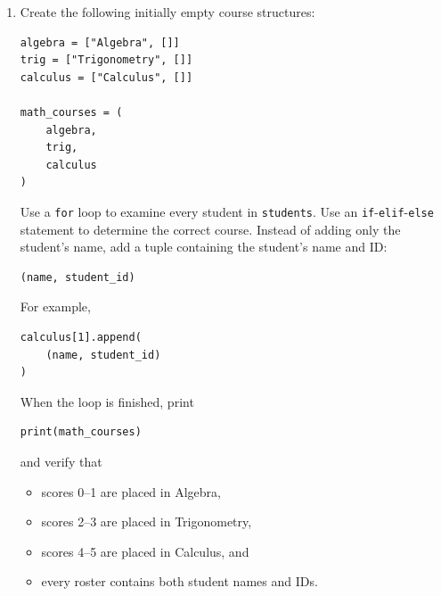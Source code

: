 \documentclass{article}
\begin{document}
\begin{enumerate}

\item Create the following initially empty course structures:

\begin{verbatim}
algebra = ["Algebra", []]
trig = ["Trigonometry", []]
calculus = ["Calculus", []]

math_courses = (
    algebra,
    trig,
    calculus
)
\end{verbatim}

Use a \texttt{for} loop to examine every student in
\texttt{students}.  Use an \texttt{if}-\texttt{elif}-\texttt{else} statement to determine the correct course. Instead of adding only the student's name, add a tuple containing the student's name and ID:

\begin{verbatim}
(name, student_id)
\end{verbatim}

For example,

\begin{verbatim}
calculus[1].append(
    (name, student_id)
)
\end{verbatim}

When the loop is finished, print

\begin{verbatim}
print(math_courses)
\end{verbatim}

and verify that

\begin{itemize}
\item scores 0--1 are placed in Algebra,
\item scores 2--3 are placed in Trigonometry,
\item scores 4--5 are placed in Calculus, and
\item every roster contains both student names and IDs.
\end{itemize}

\end{enumerate}
\end{document}
